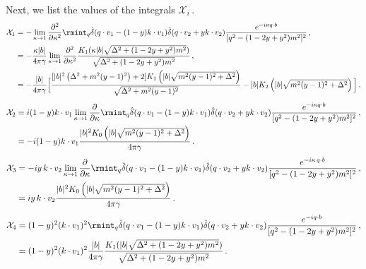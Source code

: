 Next, we list the values of the integrals $\mathcal{X}_i\,.$
\begin{align}
    \begin{split}
        \mathcal{X}_1&= -\lim_{\kappa\to 1}\frac{\partial^2}{\partial \kappa^2}   \rmint_q \hat\delta(q\cdot v_1-(1-y)k\cdot v_1)\hat\delta(q\cdot v_2+yk\cdot v_2)\frac{e^{-i\kappa q\cdot b}}{[q^2-(1-2y+y^2)m^2]^2}\,,\\ &
        =-\frac{\kappa |b|}{4\pi \gamma}\lim_{\kappa\to 1}\frac{\partial^2}{\partial \kappa^2}\frac{K_1(\kappa |b|\sqrt{\Delta^2+(1-2y+y^2)m^2})}{\sqrt{\Delta^2+(1-2y+y^2)m^2}}\,,\\ &
        =-\frac{|b|}{4\pi \gamma}\Big[\frac{[|b|^2 \left(\Delta ^2+m^2 (y-1)^2\right)+2]K_1\left(|b| \sqrt{m^2 (y-1)^2+\Delta ^2}\right)}{\sqrt{\Delta ^2+m^2 (y-1)^2}}-|b| K_2\left(|b| \sqrt{m^2 (y-1)^2+\Delta ^2}\right)\Big]\,.
    \end{split}
\end{align}
\begin{align}
    \begin{split}
        \mathcal{X}_2&=i(1-y)k\cdot v_1\lim_{\kappa\to 1}\frac{\partial}{\partial \kappa}\rmint_q \hat\delta(q\cdot v_1-(1-y)k\cdot v_1)\hat\delta(q\cdot v_2+yk\cdot v_2)\frac{e^{-i\kappa q\cdot b}}{[q^2-(1-2y+y^2)m^2]^2}\,,\\ &
        =-i(1-y)k\cdot v_1\frac{|b|^2 K_0\left(|b| \sqrt{m^2 (y-1)^2+\Delta ^2}\right)}{4 \pi  \gamma }\,.
    \end{split}
\end{align}
\begin{align}
    \begin{split}
        \mathcal{X}_3&=-iy\,k\cdot v_2\lim_{\kappa\to 1}\frac{\partial}{\partial \kappa}\rmint_q \hat\delta(q\cdot v_1-(1-y)k\cdot v_1)\hat\delta(q\cdot v_2+yk\cdot v_2)\frac{e^{-i \kappa\,q\cdot b}}{[q^2-(1-2y+y^2)m^2]^2}\,,\\ &
        =i y \,k\cdot v_2 \frac{|b|^2 K_0\left(|b| \sqrt{m^2 (y-1)^2+\Delta ^2}\right)}{4 \pi  \gamma }\,.
    \end{split}
\end{align}
\begin{align}
    \begin{split}
        \mathcal{X}_4&=(1-y)^2 (k\cdot v_1)^2\rmint_q \hat\delta(q\cdot v_1-(1-y)k\cdot v_1)\hat\delta(q\cdot v_2+yk\cdot v_2)\frac{e^{-i q\cdot b}}{[q^2-(1-2y+y^2)m^2]^2}\,,\\ &
        =(1-y)^2 (k\cdot v_1)^2\frac{|b|}{4\pi \gamma}\frac{K_1( |b|\sqrt{\Delta^2+(1-2y+y^2)m^2})}{\sqrt{\Delta^2+(1-2y+y^2)m^2}}\,.
    \end{split}
\end{align}
